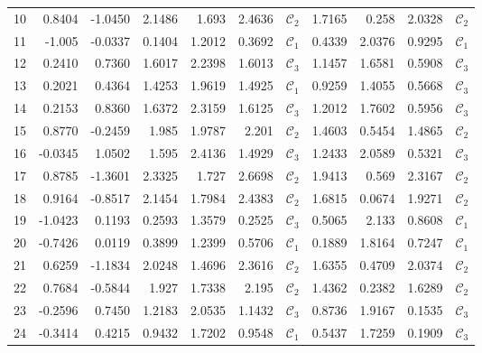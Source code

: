 \documentclass[xcolor={table}]{beamer}
\newcommand{\Botrule}[0]{\hline}
\begin{document}
\begin{frame}[plain]
\begin{table}[!tbh]
\begin{tiny}
{\begin{tabular*}{\textwidth}{@{\extracolsep{\fill}} rrr | rrrc | rrrc @{}}
10 & 0.8404 & -1.0450 & 2.1486 & 1.693 & 2.4636 & $\mathcal{C}_2$ & 1.7165 & 0.258 & 2.0328 & $\mathcal{C}_2$ \\ 
11 & -1.005 & -0.0337 & 0.1404 & 1.2012 & 0.3692 & $\mathcal{C}_1$ & 0.4339 & 2.0376 & 0.9295 & $\mathcal{C}_1$ \\ 
12 & 0.2410 & 0.7360 & 1.6017 & 2.2398 & 1.6013 & $\mathcal{C}_3$ & 1.1457 & 1.6581 & 0.5908 & $\mathcal{C}_3$ \\ 
13 & 0.2021 & 0.4364 & 1.4253 & 1.9619 & 1.4925 & $\mathcal{C}_1$ & 0.9259 & 1.4055 & 0.5668 & $\mathcal{C}_3$ \\ 
14 & 0.2153 & 0.8360 & 1.6372 & 2.3159 & 1.6125 & $\mathcal{C}_3$ & 1.2012 & 1.7602 & 0.5956 & $\mathcal{C}_3$ \\ 
15 & 0.8770 & -0.2459 & 1.985 & 1.9787 & 2.201 & $\mathcal{C}_2$ & 1.4603 & 0.5454 & 1.4865 & $\mathcal{C}_2$ \\ 
16 & -0.0345 & 1.0502 & 1.595 & 2.4136 & 1.4929 & $\mathcal{C}_3$ & 1.2433 & 2.0589 & 0.5321 & $\mathcal{C}_3$ \\ 
17 & 0.8785 & -1.3601 & 2.3325 & 1.727 & 2.6698 & $\mathcal{C}_2$ & 1.9413 & 0.569 & 2.3167 & $\mathcal{C}_2$ \\ 
18 & 0.9164 & -0.8517 & 2.1454 & 1.7984 & 2.4383 & $\mathcal{C}_2$ & 1.6815 & 0.0674 & 1.9271 & $\mathcal{C}_2$ \\ 
19 & -1.0423 & 0.1193 & 0.2593 & 1.3579 & 0.2525 & $\mathcal{C}_3$ & 0.5065 & 2.133 & 0.8608 & $\mathcal{C}_1$ \\ 
20 & -0.7426 & 0.0119 & 0.3899 & 1.2399 & 0.5706 & $\mathcal{C}_1$ & 0.1889 & 1.8164 & 0.7247 & $\mathcal{C}_1$ \\ 
21 & 0.6259 & -1.1834 & 2.0248 & 1.4696 & 2.3616 & $\mathcal{C}_2$ & 1.6355 & 0.4709 & 2.0374 & $\mathcal{C}_2$ \\ 
22 & 0.7684 & -0.5844 & 1.927 & 1.7338 & 2.195 & $\mathcal{C}_2$ & 1.4362 & 0.2382 & 1.6289 & $\mathcal{C}_2$ \\ 
23 & -0.2596 & 0.7450 & 1.2183 & 2.0535 & 1.1432 & $\mathcal{C}_3$ & 0.8736 & 1.9167 & 0.1535 & $\mathcal{C}_3$ \\ 
24 & -0.3414 & 0.4215 & 0.9432 & 1.7202 & 0.9548 & $\mathcal{C}_1$ & 0.5437 & 1.7259 & 0.1909 & $\mathcal{C}_3$ \\ 
\Botrule
\end{tabular*}
}
{}
\end{tiny}
\end{table}
\end{frame}
\end{document}
